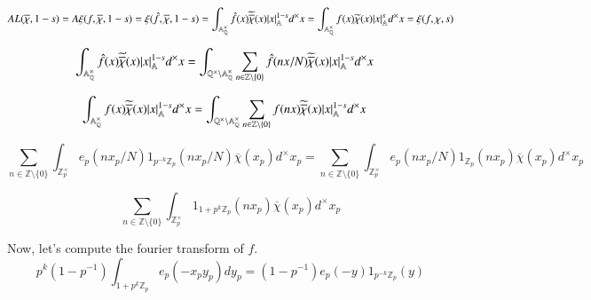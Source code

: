 \documentclass[a4paper, 12pt]{article}
\theoremstyle{Mydefinition}
\theoremstyle{Mytheorem}
\begin{document}
\begin{enumerate}
    \begin{equation}
    AL(\overline{\chi}, 1-s)=A\xi(f, \overline{\chi}, 1-s)=\xi(\hat{f},\overline{\chi},1-s)=\int_{\mathbb{A}_\mathbb{Q}^\times} \hat{f}(x)\widetilde{\overline{\chi}}(x)\abs{x}_{\mathbb{A}}^{1-s} d^\times x = \int_{\mathbb{A}_\mathbb{Q}^\times} f(x)\widetilde{\chi}(x)\abs{x}_{\mathbb{A}}^s d^\times x = \xi(f,\chi,s)
    \end{equation}
    
    \begin{equation}
    \begin{split}
        \int_{\mathbb{A}_\mathbb{Q}^\times} \hat{f}(x)\widetilde{\overline{\chi}}(x)\abs{x}_{\mathbb{A}}^{1-s} d^\times x &= \int_{\mathbb{Q}^\times\backslash\mathbb{A}_\mathbb{Q}^\times} \sum_{n\in\mathbb{Z}\setminus\{0\}}\hat{f}(nx/N)\widetilde{\overline{\chi}}(x)\abs{x}_{\mathbb{A}}^{1-s} d^\times x
    \end{split}
    \end{equation}
    
     \begin{equation}
    \begin{split}
        \int_{\mathbb{A}_\mathbb{Q}^\times} f(x)\widetilde{\overline{\chi}}(x)\abs{x}_{\mathbb{A}}^{1-s} d^\times x &= \int_{\mathbb{Q}^\times\backslash\mathbb{A}_\mathbb{Q}^\times} \sum_{n\in\mathbb{Z}\setminus\{0\}}f(nx)\widetilde{\overline{\chi}}(x)\abs{x}_{\mathbb{A}}^{1-s} d^\times x
    \end{split}
    \end{equation}
    
    \begin{equation}
         \sum_{n\in\mathbb{Z}\setminus\{0\}}\int_{\mathbb{Z}_p^\times} e_p(n x_p/N)1_{p^{-k}\mathbb{Z}_p}(nx_p/N)\overline{\chi}(x_p)d^\times x_p = \sum_{n\in\mathbb{Z}\setminus\{0\}}\int_{\mathbb{Z}_p^\times}  e_p(n x_p/N)1_{\mathbb{Z}_p}(nx_p)\overline{\chi}(x_p)d^\times x_p
    \end{equation}
    
    \begin{equation}
        \sum_{n\in\mathbb{Z}\setminus\{0\}}\int_{\mathbb{Z}_p^\times} 1_{1+p^k\mathbb{Z}_p}(nx_p)\overline{\chi}(x_p)d^\times x_p
    \end{equation}
    
    Now, let's compute the fourier transform of $f$.
    \begin{equation}
        p^k\left(1-p^{-1}\right)\int_{1+p^k\mathbb{Z}_p} e_p(-x_py_p)dy_p = \left(1-p^{-1}\right)e_p(-y)1_{p^{-k}\mathbb{Z}_p}(y)
    \end{equation}
    

\end{enumerate}
\end{document}
